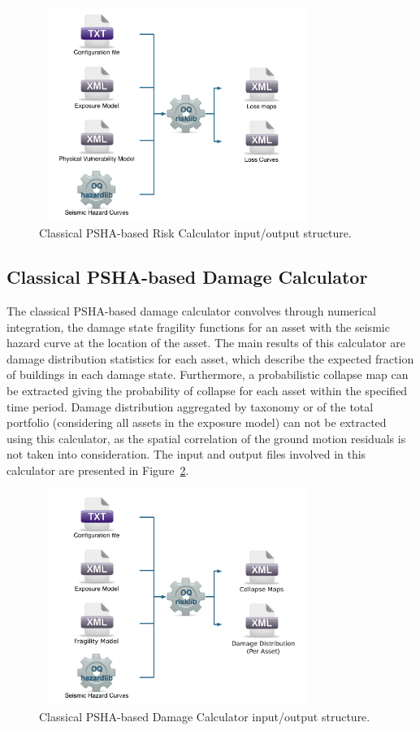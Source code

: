 \begin{figure}[ht]
\centering
\includegraphics[width=9cm,height=7cm]{figures/risk/ClassicalRisk.pdf}
\caption{Classical PSHA-based Risk Calculator input/output structure.}
\label{fig:ClassicalRisk}
\end{figure}

\subsection{Classical PSHA-based Damage Calculator}
The classical PSHA-based damage calculator convolves through numerical integration, the damage state fragility functions for an asset with the seismic hazard curve at the location of the asset. The main results of this calculator are damage distribution statistics for each asset, which describe the expected fraction of buildings in each damage state. Furthermore, a probabilistic collapse map can be extracted giving the probability of collapse for each asset within the specified time period. Damage distribution aggregated by taxonomy or of the total portfolio (considering all assets in the exposure model) can not be extracted using this calculator, as the spatial correlation of the ground motion residuals is not taken into consideration. The input and output files involved in this calculator are presented in Figure~\ref{fig:ClassicalDamage}.

\begin{figure}[ht]
\centering
\includegraphics[width=9cm,height=7cm]{figures/risk/ClassicalDamage.pdf}
\caption{Classical PSHA-based Damage Calculator input/output structure.}
\label{fig:ClassicalDamage}
\end{figure}

